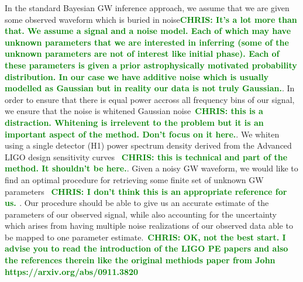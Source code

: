 \documentclass[%
showpacs,
 amsmath,amssymb,
 aps,
 twocolumn,
 prl,
 reprint,
floatfix,
]{revtex4-1}
\newcommand{\chris}[1]{\textbf{\textcolor{green}{CHRIS: #1}}}
\begin{document}
%
%
In the standard Bayesian \ac{GW} inference approach, we assume that we are
given some observed waveform which is buried in noise\chris{It's a lot more
than that. We assume a signal and a noise model. Each of which may have unknown
parameters that we are interested in inferring (some of the unknown parameters
are not of interest like initial phase). Each of these parameters is given a
prior astrophysically motivated probability distribution. In our case we have
additive noise which is usually modelled as Gaussian but in reality our data is
not truly Gaussian.}. In order to ensure that there is equal power accross all
frequency bins of our signal, we ensure that the noise is whitened Gaussian
noise~\chris{this is a distraction. Whitening is irrelevent to the problem
but it is an important aspect of the method.  Don't focus on it here.}. We
whiten using a single detector (H1) power spectrum density derived from the
Advanced LIGO design sensitivity curves \cite{2016LRR....19....1A}~\chris{this
is technical and part of the method. It shouldn't be here.}. Given a noisy
\ac{GW} waveform, we would like to find an optimal procedure for retrieving
some finite set of unknown GW parameters \cite{Jaranowski2012}~\chris{I don't
think this is an appropriate reference for us. }. Our procedure should be able
to give us an accurate estimate of the parameters of our observed signal, while
also accounting for the uncertainty which arises from having multiple noise
realizations of our observed data able to be mapped to one parameter
estimate.~\chris{OK, not the best start. I advise you to read the introduction
of the LIGO PE papers and also the references therein like the original
methiods paper from John https://arxiv.org/abs/0911.3820}
\end{document}
